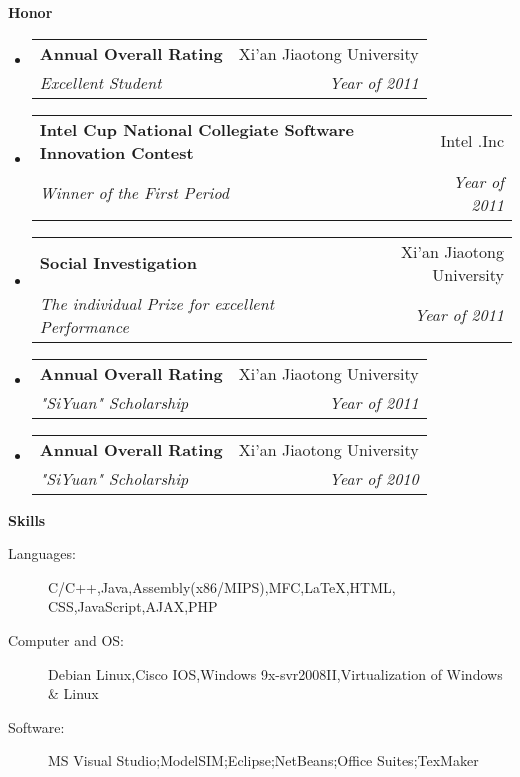 \documentclass[letterpaper,11pt]{article}
\makeatletter
\newcommand{\resheading}[1]{{\large \colorbox{mygrey}{\begin{minipage}{\textwidth}{\textbf{#1 \vphantom{p\^{E}}}}\end{minipage}}}}
\newcommand{\ressubheading}[4]{
\begin{tabular*}{6.5in}{l@{\extracolsep{\fill}}r}
		\textbf{#1} & #2 \\
		\textit{#3} & \textit{#4} \\
\end{tabular*}\vspace{-6pt}}
\makeatother
\begin{document}
\resheading{Honor}
	\begin{itemize}
		\item
			\ressubheading{Annual Overall Rating}{Xi'an Jiaotong University}{Excellent Student}{Year of 2011}
		\item
			\ressubheading{Intel Cup National Collegiate Software Innovation Contest}{Intel .Inc}{Winner of the First Period}{Year of 2011}
		\item
			\ressubheading{Social Investigation}{Xi'an Jiaotong University}{The individual Prize for excellent Performance}{Year of 2011}
		\item
			\ressubheading{Annual Overall Rating}{Xi'an Jiaotong University}{"SiYuan" Scholarship}{Year of 2011}
		\item
			\ressubheading{Annual Overall Rating}{Xi'an Jiaotong University}{"SiYuan" Scholarship}{Year of 2010}
		\end{itemize}
	

	

\resheading{Skills}
	\begin{description}
		\item[Languages:] { \footnotesize C/C++,Java,Assembly(x86/MIPS),MFC,LaTeX,HTML, CSS,JavaScript,AJAX,PHP}
		\item[Computer and OS:] { \footnotesize Debian Linux,Cisco IOS,Windows 9x-svr2008II,Virtualization of Windows \& Linux}
		\item[Software:]{\footnotesize {MS Visual Studio};{ModelSIM};{Eclipse};{NetBeans};{Office Suites};{TexMaker}}  
	\end{description} %
\end{document}
